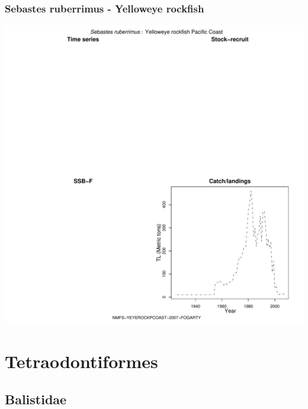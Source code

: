 \subsubsection{Sebastes ruberrimus - Yelloweye rockfish}
\begin{center}
\includegraphics[width=1.2\textwidth]{../R/figures/NMFS-YEYEROCKPCOAST-2007-FOGARTY.pdf}
\end{center}

\section{Tetraodontiformes}

\subsection{Balistidae}

